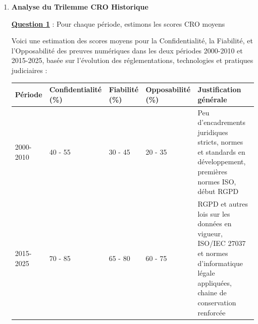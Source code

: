 \documentclass[12pt, a4paper]{article}
\newcommand{\question}[1]{\textbf{\underline{Question #1}}}
\begin{document}
\begin{enumerate}[label=\textbf{\arabic*.}, start=3]
		$$\sum_{i}^{}x_{i}y_{i} = 11419$$
		
		$$\sum_{i}^{}x_{i}^{2} = 31973$$
		
		$$k \approx \frac{11419}{31973} \approx 0.357$$
		
		\question{4} : Prédiction sur le timing du prochain changement de régime
		
		Pour prédire le timing du prochain changement de régime numérique, on utilise la loi empirique estimée précédemment : $\mathbf{\mathrm{\Delta}}\mathbf{t}_{\mathbf{n + 1}} = k\mathrm{\Delta}\mathbf{t}_{\mathbf{n}}$ avec $\mathbf{k} \approx 0.357$
		
		Le dernier intervalle connu (entre 2010 et 2025, environ 15 ans) sert de base à la prédiction.
		
		Calcul :
		
		$$\mathbf{\mathrm{\Delta}}\mathbf{t}_{\mathbf{dernier}} = 15\ ans$$
		
		$$\mathbf{\mathrm{\Delta}}\mathbf{t}_{\mathbf{prochain}} = k \times \mathrm{\Delta}\mathbf{t}_{\mathbf{dernier}} = 0.357 \times 15 \approx 5.36\ ans$$
		
		Cela signifie que le prochain changement de régime est attendu dans environ 5 à 6 ans après 2025, soit vers l'année : $2025 + 5.36 \approx 2030 - 2031$
		
		Selon ce modèle, le prochain changement majeur de régime de vérité numérique devrait intervenir autour de 2030-2031.
		
		Cela reste une estimation basée sur la tendance historique des durées entre changements passés, avec les incertitudes inhérentes aux évolutions sociales, technologiques et juridiques.
		
		\item \textbf{Analyse du Trilemme CRO Historique}
		
		\question{1} : Pour chaque période, estimons les scores CRO moyens
		
		Voici une estimation des scores moyens pour la Confidentialité, la Fiabilité, et l'Opposabilité des preuves numériques dans les deux périodes 2000-2010 et 2015-2025, basée sur l'évolution des réglementations, technologies et pratiques judiciaires :
		
		\begin{tabular}{|p{3cm}|p{2.5cm}|p{2.5cm}|p{2.5cm}|p{4cm}|}
			\hline
			\textbf{Période} & \textbf{Confidentialité (\%)} & \textbf{Fiabilité (\%)} & \textbf{Opposabilité (\%)} & \textbf{Justification générale} \\
			\hline
			2000-2010 & 40 - 55 & 30 - 45 & 20 - 35 & Peu d'encadrements juridiques stricts, normes et standards en développement, premières normes ISO, début RGPD \\
			\hline
			2015-2025 & 70 - 85 & 65 - 80 & 60 - 75 & RGPD et autres lois sur les données en vigueur, ISO/IEC 27037 et normes d'informatique légale appliquées, chaine de conservation renforcée \\
			\hline
		\end{tabular}
		

\end{enumerate}
\end{document}
